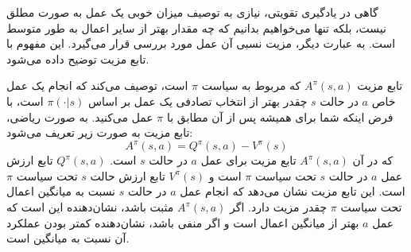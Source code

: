   گاهی در یادگیری تقویتی، نیازی به توصیف میزان خوبی یک عمل به صورت مطلق نیست، بلکه تنها می‌خواهیم بدانیم که چه مقدار بهتر از سایر اعمال به طور متوسط است. به عبارت دیگر، مزیت نسبی آن عمل مورد بررسی قرار می‌گیرد. این مفهوم با تابع مزیت توضیح داده می‌شود.
  
  تابع مزیت \( A^{\pi}(s,a) \) که مربوط به سیاست \( \pi \) است، توصیف می‌کند که انجام یک عمل خاص \( a \) در حالت \( s \) چقدر بهتر از انتخاب تصادفی یک عمل بر اساس \( \pi(\cdot|s) \) است، با فرض اینکه شما برای همیشه پس از آن مطابق با \( \pi \) عمل می‌کنید. به صورت ریاضی، تابع مزیت به صورت زیر تعریف می‌شود:
  \[
  A^{\pi}(s,a) = Q^{\pi}(s,a) - V^{\pi}(s)
  \]
که در آن \( A^{\pi}(s,a) \) تابع مزیت برای عمل \( a \) در حالت \( s \) است. \( Q^{\pi}(s,a) \) تابع ارزش عمل \( a \) در حالت \( s \) تحت سیاست \( \pi \) است و \( V^{\pi}(s) \) تابع ارزش حالت \( s \) تحت سیاست \( \pi \) است.
  این تابع مزیت نشان می‌دهد که انجام عمل \( a \) در حالت \( s \) نسبت به میانگین اعمال تحت سیاست \( \pi \) چقدر مزیت دارد. اگر \( A^{\pi}(s,a) \) مثبت باشد، نشان‌دهنده این است که عمل \( a \) بهتر از میانگین اعمال است و اگر منفی باشد، نشان‌دهنده کمتر بودن عملکرد آن نسبت به میانگین است.
  
 
   
  
  
  
  
  
  
  
  
